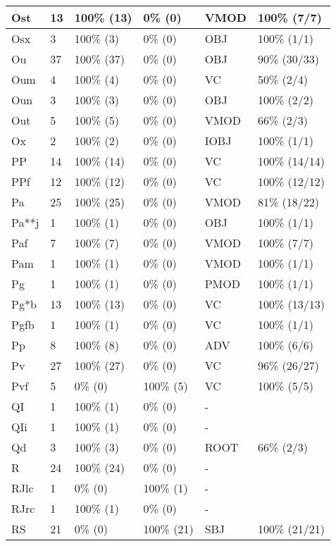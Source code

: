 \begin{figure*}
\begin{tabular}{|l|l|l|l||l|l|}
\hline
 Ost & 13 & 100\% (13) & 0\% (0) & VMOD & 100\% (7/7) \\ 
\hline
 Osx & 3 & 100\% (3) & 0\% (0) & OBJ & 100\% (1/1) \\ 
\hline
 Ou & 37 & 100\% (37) & 0\% (0) & OBJ & 90\% (30/33) \\ 
\hline
 Oum & 4 & 100\% (4) & 0\% (0) & VC & 50\% (2/4) \\ 
\hline
 Oun & 3 & 100\% (3) & 0\% (0) & OBJ & 100\% (2/2) \\ 
\hline
 Out & 5 & 100\% (5) & 0\% (0) & VMOD & 66\% (2/3) \\ 
\hline
 Ox & 2 & 100\% (2) & 0\% (0) & IOBJ & 100\% (1/1) \\ 
\hline
 PP & 14 & 100\% (14) & 0\% (0) & VC & 100\% (14/14) \\ 
\hline
 PPf & 12 & 100\% (12) & 0\% (0) & VC & 100\% (12/12) \\ 
\hline
 Pa & 25 & 100\% (25) & 0\% (0) & VMOD & 81\% (18/22) \\ 
\hline
 Pa**j & 1 & 100\% (1) & 0\% (0) & OBJ & 100\% (1/1) \\ 
\hline
 Paf & 7 & 100\% (7) & 0\% (0) & VMOD & 100\% (7/7) \\ 
\hline
 Pam & 1 & 100\% (1) & 0\% (0) & VMOD & 100\% (1/1) \\ 
\hline
 Pg & 1 & 100\% (1) & 0\% (0) & PMOD & 100\% (1/1) \\ 
\hline
 Pg*b & 13 & 100\% (13) & 0\% (0) & VC & 100\% (13/13) \\ 
\hline
 Pgfb & 1 & 100\% (1) & 0\% (0) & VC & 100\% (1/1) \\ 
\hline
 Pp & 8 & 100\% (8) & 0\% (0) & ADV & 100\% (6/6) \\ 
\hline
 Pv & 27 & 100\% (27) & 0\% (0) & VC & 96\% (26/27) \\ 
\hline
 Pvf & 5 & 0\% (0) & 100\% (5) & VC & 100\% (5/5) \\ 
\hline
 QI & 1 & 100\% (1) & 0\% (0) & - &  \\ 
\hline
 QIi & 1 & 100\% (1) & 0\% (0) & - &  \\ 
\hline
 Qd & 3 & 100\% (3) & 0\% (0) & ROOT & 66\% (2/3) \\ 
\hline
 R & 24 & 100\% (24) & 0\% (0) & - &  \\ 
\hline
 RJlc & 1 & 0\% (0) & 100\% (1) & - &  \\ 
\hline
 RJrc & 1 & 100\% (1) & 0\% (0) & - &  \\ 
\hline
 RS & 21 & 0\% (0) & 100\% (21) & SBJ & 100\% (21/21) \\ 
\hline
\end{tabular}
\end{figure*}
